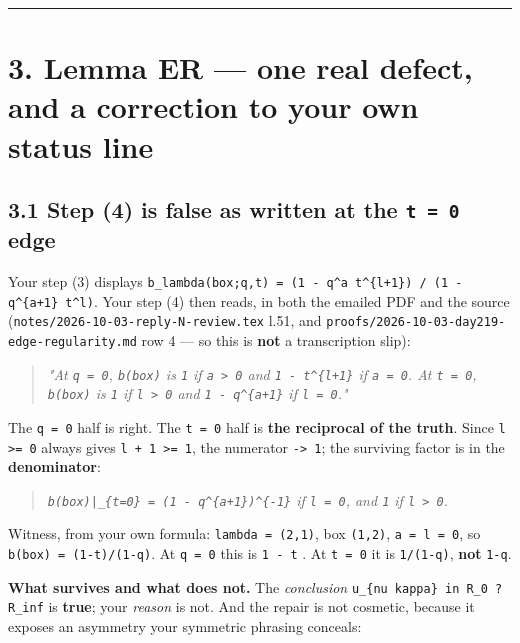 \documentclass[11pt,a4paper]{article}
\begin{document}
\medskip\hrule\medskip

\section*{3. Lemma ER --- one real defect, and a correction to your own status line}

\subsection*{3.1 Step (4) is false as written at the \mbox{\texttt{t = 0}} edge}

Your step (3) displays \mbox{\texttt{b\_lambda(box;q,t) = (1 - q\textasciicircum{}a t\textasciicircum{}\{l+1\}) / (1 - q\textasciicircum{}\{a+1\} t\textasciicircum{}l)}}. Your step (4) then reads, in both the emailed PDF and the source (\mbox{\texttt{notes/2026-10-03-reply-N-review.tex}} l.51, and \mbox{\texttt{proofs/2026-10-03-day219-edge-regularity.md}} row 4 --- so this is \textbf{not} a transcription slip):

\begin{quote}\itshape "At \mbox{\texttt{q = 0}}, \mbox{\texttt{b(box)}} is \mbox{\texttt{1}} if \mbox{\texttt{a > 0}} and \mbox{\texttt{1 - t\textasciicircum{}\{l+1\}}} if \mbox{\texttt{a = 0}}. At \mbox{\texttt{t = 0}}, \mbox{\texttt{b(box)}} is \mbox{\texttt{1}} if \mbox{\texttt{l > 0}} and \mbox{\texttt{1 - q\textasciicircum{}\{a+1\}}} if \mbox{\texttt{l = 0}}."\end{quote}

The \mbox{\texttt{q = 0}} half is right. The \mbox{\texttt{t = 0}} half is \textbf{the reciprocal of the truth}. Since \mbox{\texttt{l >= 0}} always gives \mbox{\texttt{l + 1 >= 1}}, the numerator \mbox{\texttt{-> 1}}; the surviving factor is in the \textbf{denominator}:

\begin{quote}\itshape \mbox{\texttt{b(box)|\_\{t=0\} = (1 - q\textasciicircum{}\{a+1\})\textasciicircum{}\{-1\}}} if \mbox{\texttt{l = 0}}, and \mbox{\texttt{1}} if \mbox{\texttt{l > 0}}.\end{quote}

Witness, from your own formula: \mbox{\texttt{lambda = (2,1)}}, box \mbox{\texttt{(1,2)}}, \mbox{\texttt{a = l = 0}}, so \mbox{\texttt{b(box) = (1-t)/(1-q)}}. At \mbox{\texttt{q = 0}} this is \mbox{\texttt{1 - t}} \checkmark. At \mbox{\texttt{t = 0}} it is \mbox{\texttt{1/(1-q)}}, \textbf{not} \mbox{\texttt{1-q}}.

\textbf{What survives and what does not.} The \emph{conclusion} \mbox{\texttt{u\_\{nu kappa\} in R\_0 ? R\_inf}} is \textbf{true}; your \emph{reason} is not. And the repair is not cosmetic, because it exposes an asymmetry your symmetric phrasing conceals:
\end{document}
